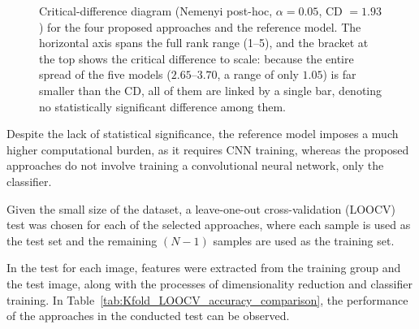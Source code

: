 \documentclass[preprint,12pt]{elsarticle}
\begin{document}
\begin{figure}[h!]
	\centering
	\caption{Critical-difference diagram (Nemenyi post-hoc, $\alpha=0.05$, CD $=1.93$) for the four proposed approaches and the reference model. The horizontal axis spans the full rank range (1--5), and the bracket at the top shows the critical difference to scale: because the entire spread of the five models ($2.65$--$3.70$, a range of only $1.05$) is far smaller than the CD, all of them are linked by a single bar, denoting no statistically significant difference among them.} \label{fig:cd}
\end{figure}

Despite the lack of statistical significance, the reference model imposes a much higher computational burden, as it requires CNN training, whereas the proposed approaches do not involve training a convolutional neural network, only the classifier.

Given the small size of the dataset, a leave-one-out cross-validation (LOOCV) test was chosen for each of the selected approaches, where each sample is used as the test set and the remaining $(N-1)$ samples are used as the training set.

In the test for each image, features were extracted from the training group and the test image, along with the processes of dimensionality reduction and classifier training. In Table~\ref{tab:Kfold_LOOCV_accuracy_comparison}, the performance of the approaches in the conducted test can be observed.
\end{document}
